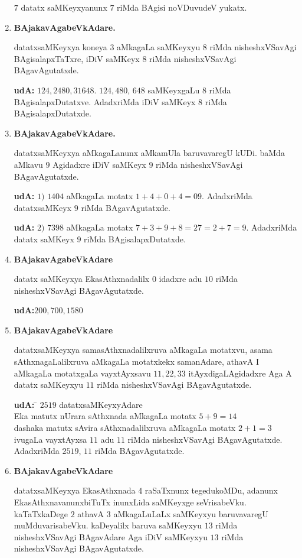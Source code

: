 \begin{enumerate}[{\rm 1)}]
$7$ datatx saMKeyxyanunx $7$ riMda BAgisi noVDuvudeV yukatx.
\item {} \textbf{BAjakavAgabeVkAdare.}

datatxsaMKeyxya koneya $3$ aMkagaLa saMKeyxyu $8$ riMda nisheshxVSavAgi BAgisalapxTaTxre, iDiV saMKeyx $8$ riMda nisheshxVSavAgi BAgavAgutatxde.

\textbf{udA:} $124,2480,31648$.  $124,480$, $648$ saMKeyxgaLu $8$ riMda BAgisalapxDutatxve. AdadxriMda iDiV saMKeyx $8$ riMda BAgisalapxDutatxde.

\vfill\eject
\item {} \textbf{BAjakavAgabeVkAdare.}

datatxsaMKeyxya aMkagaLanunx aMkamUla baruvavaregU kUDi. baMda aMkavu $9$ Agidadxre iDiV saMKeyx $9$ riMda nisheshxVSavAgi BAgavAgutatxde.

\textbf{udA:} $1)$ $1404$ aMkagaLa motatx $1+4+0+4 = 09$. AdadxriMda datatxsaMKeyx $9$ riMda BAgavAgutatxde.

\textbf{udA:} $2)$ $7398$ aMkagaLa motatx $7+3+9+8=27=2+7=9$. AdadxriMda datatx saMKeyx $9$ riMda BAgisalapxDutatxde.
\item{} \textbf{BAjakavAgabeVkAdare}

datatx saMKeyxya EkasAthxnadalilx $0$ idadxre adu $10$ riMda nisheshxVSavAgi BAgavAgutatxde.

\textbf{udA:}\quad $200,700,1580$
\item  {} \textbf{BAjakavAgabeVkAdare}

datatxsaMKeyxya samasAthxnadalilxruva aMkagaLa motatxvu, asama sAthxnagaLalilxruva aMkagaLa motatxkekx samanAdare, athavA I aMkagaLa motatxgaLa vayxtAyxsavu $11,22,33$ itAyxdigaLAgidadxre Aga A datatx saMKeyxyu $11$ riMda nisheshxVSavAgi BAga\-vAgutatxde.
\begin{tabbing}
\textbf{udA:} \;\; \= $2519$ datatxsaMKeyxyAdare\\
\> Eka matutx nUrara sAthxnada aMkagaLa motatx $5+9=14$\\
\> dashaka matutx sAvira sAthxnadalilxruva aMkagaLa motatx $2+1=3$\\
\> ivugaLa vayxtAyxsa $11$ adu $11$ riMda nisheshxVSavAgi BAgavAgutatxde.\\
\> AdadxriMda $2519$, $11$ riMda BAgavAgutatxde.
\end{tabbing}
\item {} \textbf {BAjakavAgabeVkAdare}

datatxsaMKeyxya EkasAthxnada $4$ raSaTxnunx tegedukoMDu, adanunx EkasAthxnavanunx\-biTuTx inunxLida saMKeyxge seVrisabeVku. kaTaTxkaDege $2$ athavA $3$ aMkagaLuLaLx saMKeyxyu baru\-vavaregU muMduvarisabeVku. kaDeyalilx baruva saMKeyxyu $13$ riMda nisheshxVSavAgi BAgavAdare Aga iDiV saMKeyxyu $13$ riMda nisheshxVSavAgi BAgavAgutatxde.


\end{enumerate}
